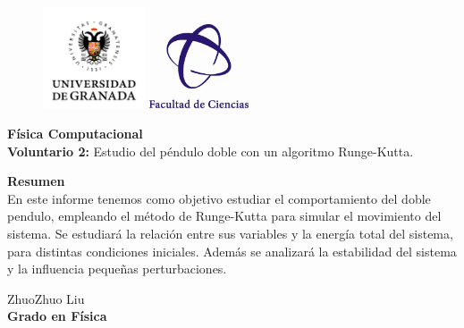 \documentclass[11pt, twoside]{article} %
\begin{document}
\begin{figure}[h!]
	\includegraphics[width=3cm]{Icons/ugr.jpg}
	\endminipage
	\includegraphics[height = 2.5cm, width=3cm]{Icons/facultad_ciencias.png}
	\endminipage
\end{figure}

\vspace{0.3cm}

\begin{center}
    \Huge \textbf{Física Computacional}\\
    		\vspace{0.4cm}
    \LARGE \textbf{Voluntario 2:}  
    Estudio del péndulo doble con un algoritmo Runge-Kutta.
\end{center}

\vspace{1cm}

\vspace{1cm}

\begin{center}
    \large \textbf{Resumen}\\
    		\vspace{0.2cm}
    \normalsize
    En este informe tenemos como objetivo estudiar el comportamiento del 
    doble pendulo, empleando el método de Runge-Kutta para simular el
    movimiento del sistema. Se estudiará la relación entre sus variables
    y la energía total del sistema, para distintas condiciones iniciales.
    Además se analizará la estabilidad del sistema y la influencia pequeñas 
    perturbaciones.

\end{center}

\vspace{1cm}

\begin{flushright}
    \large ZhuoZhuo Liu 
    \\
    \vspace{0.4cm}
    \textbf{Grado en Física}
\end{flushright}
\end{document}
